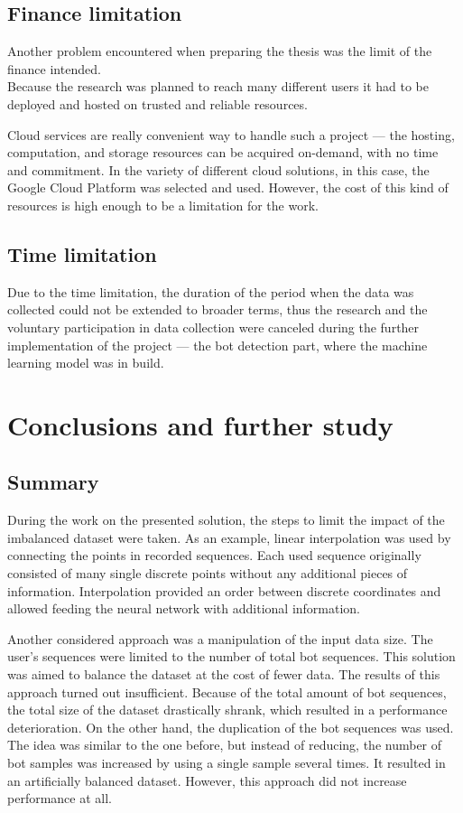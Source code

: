 \subsection{Finance limitation}\label{subsec:finance-limitation}
Another problem encountered when preparing the thesis was the limit of the finance intended.\\
Because the research was planned to reach many different users it had to be deployed and hosted on trusted and reliable resources.

Cloud services are really convenient way to handle such a project --- the hosting, computation, and storage resources can be acquired on-demand, with no time and commitment.
In the variety of different cloud solutions, in this case, the Google Cloud Platform was selected and used.
However, the cost of this kind of resources is high enough to be a limitation for the work.

\subsection{Time limitation}\label{subsec:time-limitation}
Due to the time limitation, the duration of the period when the data was collected could not be extended to broader terms, thus the research and the voluntary participation in data collection were canceled during the further implementation of the project --- the bot detection part, where the machine learning model was in build.

\section{Conclusions and further study}\label{sec:conclusions-and-further-study}

\subsection{Summary}\label{subsec:summary}
During the work on the presented solution, the steps to limit the impact of the imbalanced dataset were taken.
As an example, linear interpolation was used by connecting the points in recorded sequences.
Each used sequence originally consisted of many single discrete points without any additional pieces of information.
Interpolation provided an order between discrete coordinates and allowed feeding the neural network with additional information.

Another considered approach was a manipulation of the input data size.
The user's sequences were limited to the number of total bot sequences.
This solution was aimed to balance the dataset at the cost of fewer data.
The results of this approach turned out insufficient.
Because of the total amount of bot sequences, the total size of the dataset drastically shrank, which resulted in a performance deterioration.
On the other hand, the duplication of the bot sequences was used.
The idea was similar to the one before, but instead of reducing, the number of bot samples was increased by using a single sample several times.
It resulted in an artificially balanced dataset.
However, this approach did not increase performance at all.

